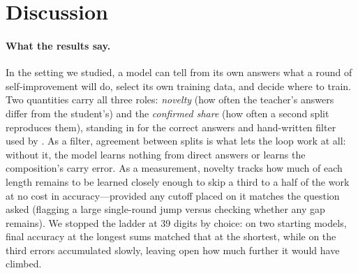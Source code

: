 \section{Discussion}
\label{sec:discussion-and-limits}

\paragraph{What the results say.}
In the setting we studied, a model can tell from its own answers what a round
of self-improvement will do, select its own training data, and decide where to
train. Two quantities carry all three roles: \emph{novelty} (how often the
teacher's answers differ from the student's) and the \emph{confirmed share}
(how often a second split reproduces them), standing in for the correct answers
and hand-written filter used by \citet{shin2026compositional}. As a filter,
agreement between splits is what lets the loop work at all: without it, the
model learns nothing from direct answers or learns the composition's carry
error. As a measurement, novelty tracks how much of each length remains to be
learned closely enough to skip a third to a half of the work at no cost in
accuracy---provided any cutoff placed on it matches the question asked
(flagging a large single-round jump versus checking whether any gap remains).
We stopped the ladder at 39 digits by choice: on two starting models, final
accuracy at the longest sums matched that at the shortest, while on the third
errors accumulated slowly, leaving open how much further it would have climbed.

